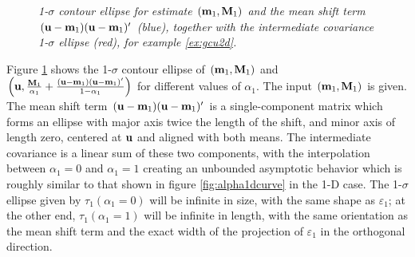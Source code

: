 \begin{example}
\begin{figure}[tbp]
    \caption{\it 1-$\sigma$ contour ellipse for estimate $(\mathbf{m}_1,\mathbf{M}_1)$ and the mean shift term
        $(\mathbf{u}-\mathbf{m}_1)(\mathbf{u}-\mathbf{m}_1)'$ (blue), together with the intermediate covariance 1-$\sigma$ ellipse (red),
        for example \ref{ex:gcu2d}.}
    \label{fig:alpha2d}
\end{figure}
Figure \ref{fig:alpha2d} shows the 1-$\sigma$ contour ellipse of $(\mathbf{m}_1,\mathbf{M}_1)$ and
$\left(\mathbf{u},\frac{\mathbf{M}_1}{\alpha_1}+\frac{(\mathbf{u}-\mathbf{m}_1)(\mathbf{u}-\mathbf{m}_1)'}{1-\alpha_1}\right)$ for different values of
$\alpha_1$. The input $(\mathbf{m}_1,\mathbf{M}_1)$ is given. The mean shift term $(\mathbf{u}-\mathbf{m}_1)(\mathbf{u}-\mathbf{m}_1)'$ is a
single-component matrix which forms an ellipse with major axis twice the length of the shift, and minor axis of
length zero, centered at $\mathbf{u}$ and aligned with both means. The intermediate covariance is a linear sum of these two
components, with the interpolation between $\alpha_1=0$ and $\alpha_1=1$ creating an unbounded asymptotic behavior which
is roughly similar to that shown in figure \ref{fig:alpha1dcurve} in the 1-D case. The 1-$\sigma$ ellipse given by
$\tau_1(\alpha_1=0)$ will be infinite in size, with the same shape as $\varepsilon_1$; at the other end,
$\tau_1(\alpha_1=1)$ will be infinite in length, with the same orientation as the mean shift term and the exact width of
the projection of $\varepsilon_1$ in the orthogonal direction.


\end{example}
